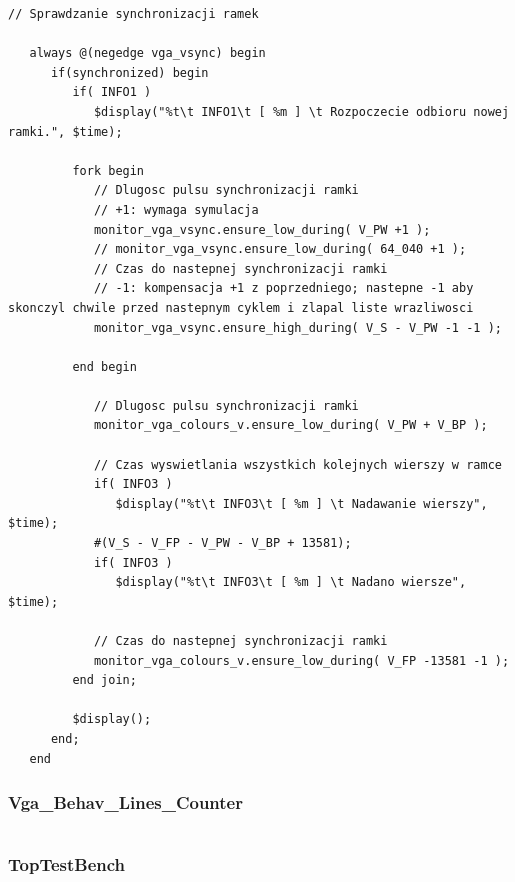 \documentclass[a4paper,12pt]{article}
\begin{document}
\begin{lstlisting}[label=Syncvga,caption=Sync.v,firstnumber=56]
   // Sprawdzanie synchronizacji ramek

   always @(negedge vga_vsync) begin
      if(synchronized) begin
         if( INFO1 )
            $display("%t\t INFO1\t [ %m ] \t Rozpoczecie odbioru nowej ramki.", $time);

         fork begin
            // Dlugosc pulsu synchronizacji ramki
            // +1: wymaga symulacja
            monitor_vga_vsync.ensure_low_during( V_PW +1 );
            // monitor_vga_vsync.ensure_low_during( 64_040 +1 );
            // Czas do nastepnej synchronizacji ramki
            // -1: kompensacja +1 z poprzedniego; nastepne -1 aby skonczyl chwile przed nastepnym cyklem i zlapal liste wrazliwosci
            monitor_vga_vsync.ensure_high_during( V_S - V_PW -1 -1 );

         end begin

            // Dlugosc pulsu synchronizacji ramki
            monitor_vga_colours_v.ensure_low_during( V_PW + V_BP );

            // Czas wyswietlania wszystkich kolejnych wierszy w ramce
            if( INFO3 )
               $display("%t\t INFO3\t [ %m ] \t Nadawanie wierszy", $time);
            #(V_S - V_FP - V_PW - V_BP + 13581);
            if( INFO3 )
               $display("%t\t INFO3\t [ %m ] \t Nadano wiersze", $time);

            // Czas do nastepnej synchronizacji ramki
            monitor_vga_colours_v.ensure_low_during( V_FP -13581 -1 );
         end join;

         $display();
      end;
   end
\end{lstlisting}




\subsubsection{Vga\_Behav\_Lines\_Counter}

\begin{lstlisting}[label=Syncvga,caption=Sync.v,firstnumber=56]

\end{lstlisting}


\subsubsection{TopTestBench}
\end{document}

